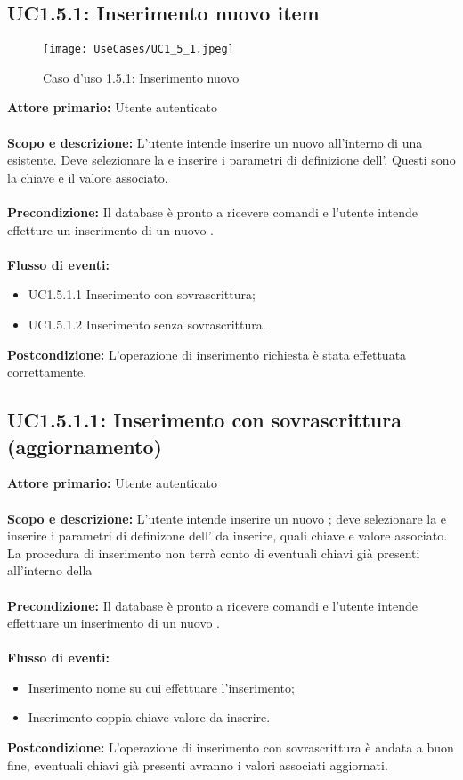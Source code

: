 \documentclass{scalatekids-article}
\begin{document}
\subsection{UC1.5.1: Inserimento nuovo item}
\begin{figure}[H]
  \begin{center}
    \texttt{[image: UseCases/UC1\_5\_1.jpeg]}
    \caption{Caso d'uso 1.5.1: Inserimento nuovo }
  \end{center}
\end{figure}
\textbf{Attore primario:} Utente autenticato\\ \\
\textbf{Scopo e descrizione:} L'utente intende inserire un nuovo  all'interno di una  esistente. Deve selezionare la  e inserire i parametri di definizione dell'. Questi sono la chiave e il valore associato.\\ \\
\textbf{Precondizione:} Il database è pronto a ricevere comandi e l'utente intende effetture un inserimento di un nuovo .\\ \\
\textbf{Flusso di eventi:}
\begin{itemize}
\item UC1.5.1.1 Inserimento con sovrascrittura;
\item UC1.5.1.2 Inserimento senza sovrascrittura.
\end{itemize}
\textbf{Postcondizione:} L'operazione di inserimento richiesta è stata effettuata correttamente.
\subsection{UC1.5.1.1: Inserimento con sovrascrittura (aggiornamento)}
\textbf{Attore primario:} Utente autenticato\\ \\
\textbf{Scopo e descrizione:} L'utente intende inserire un nuovo ; deve selezionare la  e inserire i parametri di definizone dell' da inserire, quali chiave e valore associato. La procedura di inserimento non terrà conto di
eventuali chiavi già presenti all'interno della \\ \\
\textbf{Precondizione:} Il database è pronto a ricevere comandi e l'utente intende effettuare un inserimento di un nuovo .\\ \\
\textbf{Flusso di eventi:}
\begin{itemize}
\item Inserimento nome  su cui effettuare l'inserimento;
\item Inserimento coppia chiave-valore da inserire.
\end{itemize}
\textbf{Postcondizione:} L'operazione di inserimento con sovrascrittura è andata a buon fine, eventuali chiavi già presenti avranno i valori associati aggiornati.
\end{document}
